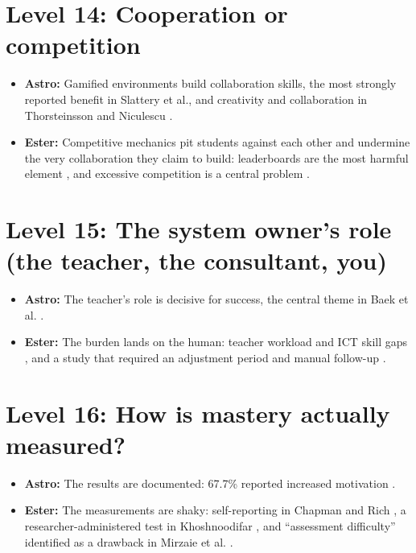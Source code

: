 \documentclass{article}
\begin{document}
\section{Level 14: Cooperation or competition}
\begin{itemize}
  \item \textbf{Astro:} Gamified environments build collaboration skills, the most strongly reported benefit in Slattery et al., and creativity and collaboration in Thorsteinsson and Niculescu \cite{slattery2023, thorsteinsson2016}.
  \item \textbf{Ester:} Competitive mechanics pit students against each other and undermine the very collaboration they claim to build: leaderboards are the most harmful element \cite{toda2018}, and excessive competition is a central problem \cite{harviainen2014}.
\end{itemize}

\section{Level 15: The system owner's role (the teacher, the consultant, you)}
\begin{itemize}
  \item \textbf{Astro:} The teacher's role is decisive for success, the central theme in Baek et al. \cite{baek2020}.
  \item \textbf{Ester:} The burden lands on the human: teacher workload and ICT skill gaps \cite{thorsteinsson2016}, and a study that required an adjustment period and manual follow-up \cite{steinbeiss2017}.
\end{itemize}

\section{Level 16: How is mastery actually measured?}
\begin{itemize}
  \item \textbf{Astro:} The results are documented: 67.7\% reported increased motivation \cite{chapman2018}.
  \item \textbf{Ester:} The measurements are shaky: self-reporting in Chapman and Rich \cite{chapman2018}, a researcher-administered test in Khoshnoodifar \cite{khoshnoodifar2023}, and ``assessment difficulty'' identified as a drawback in Mirzaie et al. \cite{mirzaiefeizabadi2022}.
\end{itemize}
\end{document}
